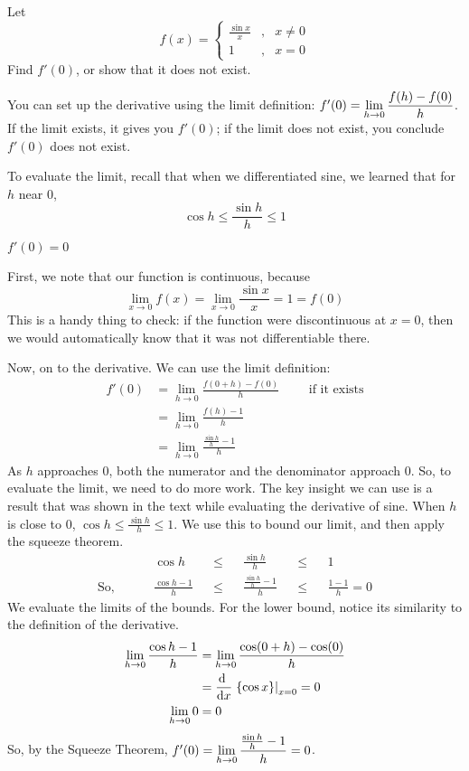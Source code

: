 \begin{question}
Let
\[f(x)=\left\{\begin{array}{ccc}
\frac{\sin x}{x}&,&x \neq 0\\
1&,&x=0
\end{array}\right.\]
Find $f'(0)$, or show that it does not exist.
\end{question}
\begin{hint}
You can set up the derivative using the limit definition: $f'(0)=\displaystyle\lim_{h \to 0}\dfrac{f(h)-f(0)}{h}$. If the limit exists, it gives you $f'(0)$; if the limit does not exist, you conclude $f'(0)$ does not exist.

To evaluate the limit, recall that when we differentiated sine, we learned that for $h$ near 0,
\[\cos h \leq \frac{\sin h}{h}\leq 1\]
\end{hint}
\begin{answer}
$f'(0)=0$
\end{answer}
\begin{solution}
First, we note that our function is continuous, because
\[\lim_{x \to 0} f(x)=\lim_{x \to 0} \frac{\sin x}{x}=1=f(0)\]
This is a handy thing to check: if the function were discontinuous at $x=0$, then we would automatically know that it was not differentiable there.

Now, on to the derivative. We can use the limit definition:
\begin{align*}
f'(0)&=\lim_{h \to 0}\frac{f(0+h)-f(0)}{h}\qquad\mbox{ if it exists}\\
&=\lim_{h \to 0} \frac{f(h)-1}{h}\\
&=\lim_{h \to 0} \frac{\frac{\sin h}{h}-1}{h}
\end{align*}
As $h$ approaches 0, both the numerator and the denominator approach 0. So, to evaluate the limit, we need to do more work. The key insight we can use is a result that was shown in the text while evaluating the derivative of sine. When $h$ is close to 0, $\cos h \leq \frac{\sin h}{h} \leq 1$. We use this to bound our limit, and then apply the squeeze theorem.
\begin{align*}
&\cos h&&\leq&&\frac{\sin h}{h}&&\leq&&1\\
\mbox{So, }\qquad&\frac{\cos h-1}{h}&&\leq&&\frac{\frac{\sin h}{h}-1}{h}&&\leq&&\frac{1-1}{h}=0
\end{align*}
We evaluate the limits of the bounds. For the lower bound, notice its similarity to the definition of the derivative.
\begin{align*}
\lim_{h \to 0}\frac{\cos h-1}{h}&=\lim_{h \to 0}\frac{\cos(0+h)-\cos(0)}{h}\\
&=\diff{}{x}\left.\left\{\cos x \right\}\right|_{x=0}=0\\
\lim_{h \to 0}0&=0
\end{align*}
So, by the Squeeze Theorem, $f'(0)=\displaystyle\lim_{h \to 0}\frac{\frac{\sin h}{h}-1}{h}=0$.
\end{solution}

